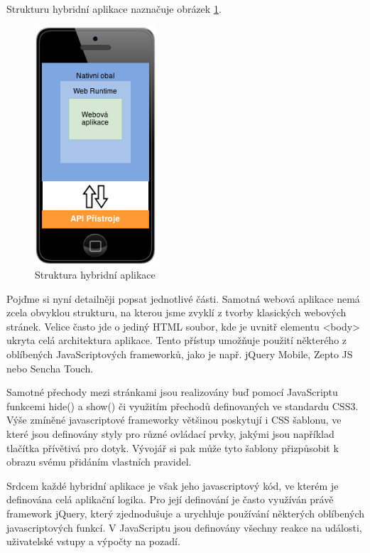 Strukturu hybridní aplikace naznačuje obrázek \ref{fig:HybridAppArchitecture}.

\begin{figure}\centering
\includegraphics[width=0.4\textwidth]{hybrid_app_architecture.png}
\caption{Struktura hybridní aplikace \cite{ibm_worklight_overview}}
\label{fig:HybridAppArchitecture}
\end{figure} 

Pojďme si nyní detailněji popsat jednotlivé části. Samotná webová aplikace nemá zcela obvyklou strukturu, na kterou jsme zvyklí z tvorby klasických webových stránek. Velice často jde o jediný HTML soubor, kde je uvnitř elementu <body> ukryta celá architektura aplikace. Tento přístup umožňuje použití některého z oblíbených JavaScriptových frameworků, jako je např. jQuery Mobile, Zepto JS nebo Sencha Touch.

Samotné přechody mezi stránkami jsou realizovány buď pomocí JavaScriptu funkcemi hide() a show() či využitím přechodů definovaných ve standardu CSS3. Výše zmíněné javascriptové frameworky většinou poskytují i CSS šablonu, ve které jsou definovány styly pro různé ovládací prvky, jakými jsou například tlačítka přívětivá pro dotyk. Vývojář si pak může tyto šablony přizpůsobit k obrazu svému přidáním vlastních pravidel.

Srdcem každé hybridní aplikace je však jeho javascriptový kód, ve kterém je definována celá aplikační logika. Pro její definování je často využíván právě framework jQuery, který zjednodušuje a urychluje používání některých oblíbených javascriptových funkcí. V JavaScriptu jsou definovány všechny reakce na události, uživatelské vstupy a výpočty na pozadí.


